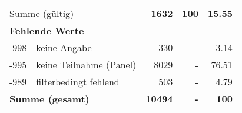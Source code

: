 \begin{longtable}{lXrrr}
     \midrule
     \multicolumn{2}{l}{Summe (gültig)} &
       \textbf{\num{1632}} &
     \textbf{\num{100}} &
       \textbf{\num[round-mode=places,round-precision=2]{15.55}} \\
     \multicolumn{5}{l}{\textbf{Fehlende Werte}}\\
       -998 &
       keine Angabe &
         \num{330} &
        - &
         \num[round-mode=places,round-precision=2]{3.14} \\
       -995 &
       keine Teilnahme (Panel) &
         \num{8029} &
        - &
         \num[round-mode=places,round-precision=2]{76.51} \\
       -989 &
       filterbedingt fehlend &
         \num{503} &
        - &
         \num[round-mode=places,round-precision=2]{4.79} \\
     \midrule
     \multicolumn{2}{l}{\textbf{Summe (gesamt)}} &
          \textbf{\num{10494}} &
        \textbf{-} &
        \textbf{\num{100}} \\
     \bottomrule
     \end{longtable}
     
